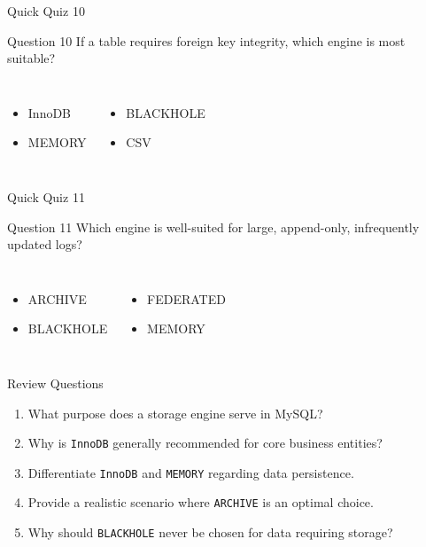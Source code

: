 \documentclass[aspectratio=169,11pt]{beamer}
\newcommand{\code}[1]{\texttt{#1}}
\newcommand{\smallitem}{\setlength{\itemsep}{2pt}}
\begin{document}
\begin{frame}{Quick Quiz 10}
\begin{block}{Question 10}
If a table requires foreign key integrity, which engine is most suitable?
\end{block}
\vspace{0.2cm}
\begin{columns}[T,onlytextwidth]
\begin{itemize}\smallitem
  \item[A.] InnoDB
  \item[B.] MEMORY
\end{itemize}
\begin{itemize}\smallitem
  \item[C.] BLACKHOLE
  \item[D.] CSV
\end{itemize}
\end{columns}
\end{frame}

\begin{frame}{Quick Quiz 11}
\begin{block}{Question 11}
Which engine is well-suited for large, append-only, infrequently updated logs?
\end{block}
\vspace{0.2cm}
\begin{columns}[T,onlytextwidth]
\begin{itemize}\smallitem
  \item[A.] ARCHIVE
  \item[B.] BLACKHOLE
\end{itemize}
\begin{itemize}\smallitem
  \item[C.] FEDERATED
  \item[D.] MEMORY
\end{itemize}
\end{columns}
\end{frame}

\begin{frame}{Review Questions}
\begin{enumerate}\smallitem
  \item What purpose does a storage engine serve in MySQL?
  \item Why is \code{InnoDB} generally recommended for core business entities?
  \item Differentiate \code{InnoDB} and \code{MEMORY} regarding data persistence.
  \item Provide a realistic scenario where \code{ARCHIVE} is an optimal choice.
  \item Why should \code{BLACKHOLE} never be chosen for data requiring storage?
\end{enumerate}
\end{frame}
\end{document}
